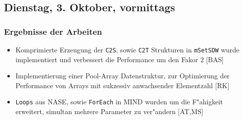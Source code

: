 \documentclass[12pt]{article}
\begin{document}
\subsection{Dienstag, 3. Oktober, vormittags}

\subsubsection{Ergebnisse der Arbeiten}
\begin{itemize}
\item Komprimierte Erzeugung der \texttt{C2S}, sowie \texttt{C2T} Strukturen in \texttt{mSetSDW} wurde implementiert und
      verbessert die Performance um den Fakor 2 [BAS]
\item Implementierung einer Pool-Array Datenstruktur, zur Optimierung der Performance von  Arrays mit sukzessiv anwachsender Elementzahl [RK] 
\item \texttt{Loops} aus NASE, sowie \texttt{ForEach} in MIND wurden um die F"ahigkeit erweitert, simultan mehrere Parameter zu ver"andern [AT,MS]
\end{itemize}



%
% 
\end{document}
